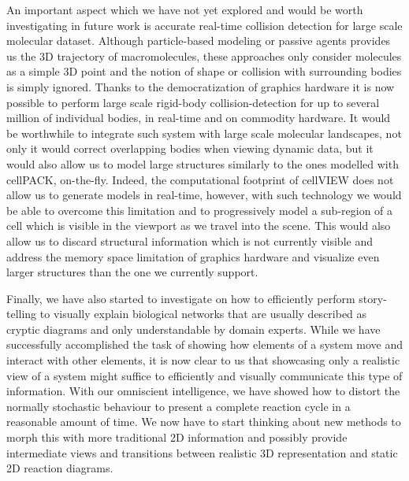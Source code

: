 An important aspect which we have not yet explored and would be worth investigating in future work is accurate real-time collision detection for large scale molecular dataset.
Although particle-based modeling or passive agents provides us the 3D trajectory of macromolecules, these approaches only consider molecules as a simple 3D point and the notion of shape or collision with surrounding bodies is simply ignored.
Thanks to the democratization of graphics hardware it is now possible to perform large scale rigid-body collision-detection for up to several million of individual bodies, in real-time and on commodity hardware.
It would be worthwhile to integrate such system with large scale molecular landscapes, not only it would correct overlapping bodies when viewing dynamic data, but it would also allow us to model large structures similarly to the ones modelled with cellPACK, on-the-fly.
Indeed, the computational footprint of cellVIEW does not allow us to generate models in real-time, however, with such technology we would be able to overcome this limitation and to progressively model a sub-region of a cell which is visible in the viewport as we travel into the scene.
This would also allow us to discard structural information which is not currently visible and address the memory space limitation of graphics hardware and visualize even larger structures than the one we currently support.

Finally, we have also started to investigate on how to efficiently perform story-telling to visually explain biological networks that are usually described as cryptic diagrams and only understandable by domain experts.
While we have successfully accomplished the task of showing how elements of a system move and interact with other elements, it is now clear to us that showcasing only a realistic view of a system might suffice to efficiently and visually communicate this type of information.
With our omniscient intelligence, we have showed how to distort the normally stochastic behaviour to present a complete reaction cycle in a reasonable amount of time.
We now have to start thinking about new methods to morph this with more traditional 2D information and possibly provide intermediate views and transitions between realistic 3D representation and static 2D reaction diagrams.

